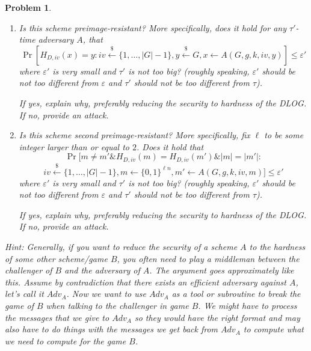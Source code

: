 \documentclass{../homework}
\newtheorem{problem}{Problem}
\newcommand{\rgets}{\stackrel{\mathdollar}\leftarrow}
\begin{document}
\begin{problem}
\begin{enumerate}
        \item Is this scheme preimage-resistant? More specifically, does it hold
        for any $\tau'$-time adversary $A$, that
        $$
            \Pr[H_{D,iv}(x)=y :iv \rgets\{1,\dots,|G|-1\},y \rgets G, x\gets
            A(G,g,k,iv,y) ]\leq \varepsilon'
        $$
        where $\varepsilon'$ is very small  and $\tau'$ is not too big? (roughly
        speaking, $\varepsilon'$ should be not too different from $\varepsilon$
        and $\tau'$ should not be too different from $\tau$).

        If yes, explain why, preferably reducing the security to hardness of the
        DLOG. If no, provide an attack.
        
        \item Is this scheme second preimage-resistant? More specifically, fix
        $\ell$ to be some integer larger than or equal to $2$. Does it hold that
        $$\Pr[m\neq m'\& H_{D,iv}(m)=H_{D,iv}(m')\&  |m|=|m'| :$$
        $$
            iv \rgets\{1,\dots,|G|-1\},m\gets \{0,1\}^{\ell n}, m'\gets
            A(G,g,k,iv,m) ]\leq \varepsilon'
        $$
        where $\varepsilon'$ is very small  and $\tau'$ is not too big? (roughly
        speaking, $\varepsilon'$ should be not too different from $\varepsilon$
        and $\tau'$ should not be too different from $\tau$).

        If yes, explain why, preferably reducing the security to hardness of the
        DLOG. If no, provide an attack.
        \end{enumerate}

        Hint: Generally, if you want to reduce the security of a scheme $A$ to
        the hardness of some other scheme/game $B$, you often need to play a
        middleman between the challenger of $B$ and the adversary of $A$.
        The argument goes approximately like this. Assume by contradiction that
        there exists an efficient adversary against $A$, let's call it $Adv_A$.
        Now we want to use $Adv_A$ as a tool or subroutine to break the game of
        $B$ when talking to the challenger in game $B$. We might have to process
        the messages that we give to $Adv_A$ so they would have the right format
        and  may also have to do things with the messages we get back from
        $Adv_A$ to compute what we need to compute for the game $B$.
\end{problem}
\end{document}
